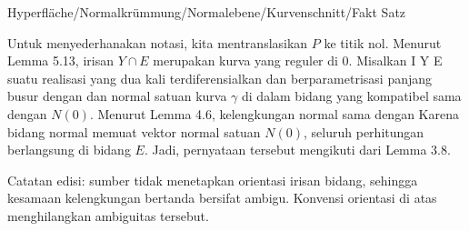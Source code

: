 {Hyperfläche/Normalkrümmung/Normalebene/Kurvenschnitt/Fakt}
{Satz}
{}
{

\faktzusatz {}
\faktzusatz {}

}
{

Untuk menyederhanakan notasi, kita mentranslasikan $P$ ke titik nol. Menurut
Lemma 5.13,
irisan $Y \cap E$ merupakan kurva yang reguler di $0$. Misalkan
\maabbdisp {\gamma} { I } { Y \cap E
} {}
suatu realisasi yang dua kali terdiferensialkan dan berparametrisasi panjang busur dengan
dan normal satuan kurva $\gamma$ di dalam bidang yang kompatibel sama dengan $N(0)$. Menurut
Lemma 4.6,
kelengkungan normal sama dengan
 Karena bidang normal memuat vektor normal satuan $N(0)$, seluruh perhitungan berlangsung di bidang $E$. Jadi, pernyataan tersebut mengikuti dari
Lemma 3.8.

Catatan edisi: sumber tidak menetapkan orientasi irisan bidang, sehingga kesamaan kelengkungan bertanda bersifat ambigu. Konvensi orientasi di atas menghilangkan ambiguitas tersebut.

}
